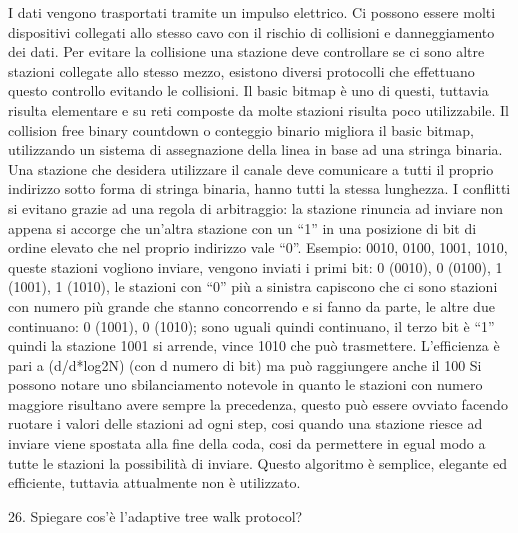 I dati vengono trasportati tramite un impulso elettrico. Ci possono essere molti dispositivi collegati allo stesso cavo con il rischio di collisioni e danneggiamento dei dati.
Per evitare la collisione una stazione deve controllare se ci sono altre stazioni collegate allo stesso mezzo, esistono diversi protocolli che effettuano questo controllo evitando le collisioni.
Il basic bitmap è uno di questi, tuttavia risulta elementare e su reti composte da molte stazioni risulta poco utilizzabile.
Il collision free binary countdown o conteggio binario migliora il basic bitmap, utilizzando un sistema di assegnazione della linea in base ad una stringa binaria.
Una stazione che desidera utilizzare il canale deve comunicare a tutti il proprio indirizzo sotto forma di stringa binaria, hanno tutti la stessa lunghezza.
I conflitti si evitano grazie ad una regola di arbitraggio: la stazione rinuncia ad inviare non appena si accorge che un’altra stazione con un “1” in una posizione di bit di ordine elevato che nel proprio indirizzo vale “0”.
Esempio: 0010, 0100, 1001, 1010, queste stazioni vogliono inviare, vengono inviati i primi bit: 0 (0010), 0 (0100), 1 (1001), 1 (1010), le stazioni con “0” più a sinistra capiscono che ci sono stazioni con numero più grande che stanno concorrendo e si fanno da parte, le altre due continuano: 0 (1001), 0 (1010); sono uguali quindi continuano, il terzo bit è “1” quindi la stazione 1001 si arrende, vince 1010 che può trasmettere.
L’efficienza è pari a (d/d*log2N) (con d numero di bit) ma può raggiungere anche il 100%
Si possono notare uno sbilanciamento notevole in quanto le stazioni con numero maggiore risultano avere sempre la precedenza, questo può essere ovviato facendo ruotare i valori delle stazioni ad ogni step, cosi quando una stazione riesce ad inviare viene spostata alla fine della coda, cosi da permettere in egual modo a tutte le stazioni la possibilità di inviare.
Questo algoritmo è semplice, elegante ed efficiente, tuttavia attualmente non è utilizzato.

 

26.	Spiegare cos’è l’adaptive tree walk protocol?

